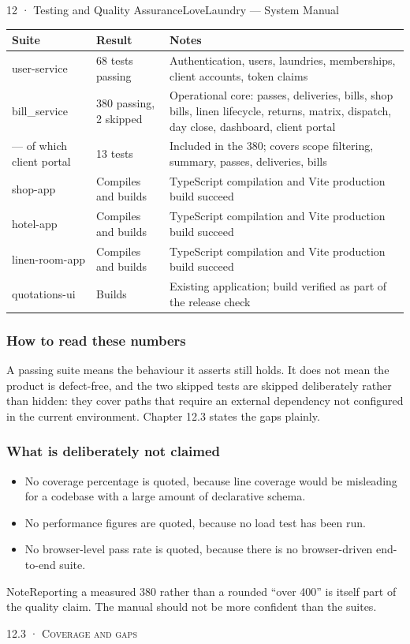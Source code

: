 \documentclass[11pt,a4paper,oneside]{book}
\begin{document}
12 · Testing and Quality AssuranceLoveLaundry — System Manual

\begin{center}\small
\begin{tabularx}{\linewidth}{|X|X|X|}
\hline
\rowcolor{lightgrey}
\textbf{Suite} & \textbf{Result} & \textbf{Notes} \\ \hline
user-service & 68 tests passing & Authentication, users, laundries, memberships, client accounts, token claims \\ \hline
bill\_service & 380 passing, 2 skipped & Operational core: passes, deliveries, bills, shop bills, linen lifecycle, returns, matrix, dispatch, day close, dashboard, client portal \\ \hline
— of which client portal & 13 tests & Included in the 380; covers scope filtering, summary, passes, deliveries, bills \\ \hline
shop-app & Compiles and builds & TypeScript compilation and Vite production build succeed \\ \hline
hotel-app & Compiles and builds & TypeScript compilation and Vite production build succeed \\ \hline
linen-room-app & Compiles and builds & TypeScript compilation and Vite production build succeed \\ \hline
quotations-ui & Builds & Existing application; build verified as part of the release check \\ \hline
\end{tabularx}
\end{center}
\subsubsection*{How to read these numbers}
A passing suite means the behaviour it asserts still holds. It does not mean the product is defect-free, and the two skipped tests are skipped deliberately rather than hidden: they cover paths that require an external dependency not configured in the current environment. Chapter 12.3 states the gaps plainly.

\subsubsection*{What is deliberately not claimed}
\begin{itemize}
\item No coverage percentage is quoted, because line coverage would be misleading for a codebase with a large amount of declarative schema.
\item No performance figures are quoted, because no load test has been run.
\item No browser-level pass rate is quoted, because there is no browser-driven end-to-end suite.
\end{itemize}
\begin{notebox}NoteReporting a measured 380 rather than a rounded “over 400” is itself part of the quality claim. The manual should not be more confident than the suites.\end{notebox}
\textsc{\small\color{crimson}12.3 · Coverage and gaps}\par\medskip
\end{document}
